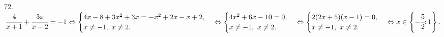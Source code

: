 72. $\cfrac{4}{x+1}+\cfrac{3x}{x-2}=-1\Leftrightarrow\begin{cases}4x-8+3x^2+3x=-x^2+2x-x+2,\\ x\neq-1,\ x\neq2.\end{cases}
\Leftrightarrow\begin{cases}4x^2+6x-10=0,\\ x\neq-1,\ x\neq2.\end{cases}
\Leftrightarrow\begin{cases}2(2x+5)(x-1)=0,\\ x\neq-1,\ x\neq2.\end{cases}\Leftrightarrow x\in\left\{-\cfrac{5}{2};1\right\}.$\\
